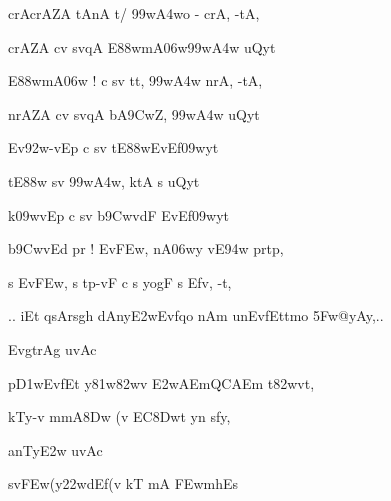{\dn crAcrAZA\2 tAnA\2 t/ \399w\?\3A4wo {\rs -\re} crA, -tA,{\dandadn} \dontdisplaylinenum}

{\dn crAZA\2 c\4v sv\?{\qvb}qA\2 E\388wmA\306w\399w\?\3A4w uQyt\? \vegdn\dontdisplaylinenum}

{\dn {}E\388wmA\306w {\rs !\re} c sv\?{\qvb} tt, \399w\?\3A4w nrA, -tA,{\dandabdn} \dontdisplaylinenum}

{\dn nrAZA\2 c\4v sv\?{\qvb}qA\2 b\5A\39CwZ, \399w\?\3A4w uQyt\? \vegdn\dontdisplaylinenum}

{\dn Ev\392w-v\0Ep c sv\?{\qvb} tE\388wEv\0Ef\309wyt\?{\dandabdn} \dontdisplaylinenum}

{\dn {}tE\388w sv\?{\qvb} \399w\?\3A4w, ktA\0 s uQyt\? \vegdn\dontdisplaylinenum}

{\dn k\0\309wvEp c sv\?{\qvb} b\5\39Cwv\?dF EvEf\309wyt\?{\dandabdn} \dontdisplaylinenum}

{\dn b\5\39Cwv\?Ed pr\2 {\rs !\re} Ev\3FEw, nA\306wy\2 v\?E\394w pr\2tp,{\dandadn}\dontdisplaylinenum }

{\dn s Ev\3FEw, s tp-vF c s yogF s Efv, -t, \vegdn\dontdisplaylinenum}

{\dn 
\jump
\begin{center}
{..} iEt qsArs\2g\5h\? dAny\3E2wEvf\?qo nAm unEv\2fEttmo \35Fw@yAy,{..}
\end{center}\vers}
\bekveg\szamveg\vfill\phpspagebreak\szam\bek{}
\thispagestyle{empty}



\jump\jump
\dnvers

{\dn EvgtrAg uvAc{\dandabdn}\dontdisplaylinenum }

{\dn p\3D1wEv\2fEt y\381w\382wv\2 \3E2wAEmQCAEm t\382wvt,{\dandadn} \dontdisplaylinenum}

{\dn kTy-v mmA\38Dw (v\2 EC\38Dwt\? y\?n s\2fy, \vegdn\dontdisplaylinenum}



{\dn anT\0y\3E2w uvAc{\dandabdn}\dontdisplaylinenum }

{\dn sv\0\3FEw(y\322wdEf\0(v\2 kT\2 mA\2 \3FEwmh\0Es{\dandadn} \dontdisplaylinenum}

